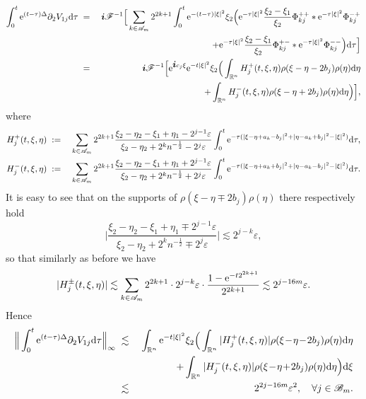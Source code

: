 \documentclass[11pt]{article}
\newcommand{\rmd}{\mbox{\rm d}}
\newcommand{\bfi}{{\mbox{\boldmath $i$}}}
\newcommand{\rme}{{\rm e}}
\begin{document}
\begin{eqnarray*}
  \int_0^t\rme^{(t-\tau)\Delta}\partial_2V_{1j}\rmd\tau&\;=\;&
  \bfi\mathscr{F}^{-1}\Big[\sum_{k\in\mathscr{A}_m}2^{2k+1}\int_0^t\rme^{-(t-\tau)|\xi|^2}\xi_2\Big(\rme^{-\tau|\xi|^2}
  \frac{\xi_2-\xi_1}{\xi_2}\Phi_{kj}^{++}\ast\rme^{-\tau|\xi|^2}\Phi_{kj}^{-+}
\\
  &&\quad +\rme^{-\tau|\xi|^2}\frac{\xi_2-\xi_1}{\xi_2}\Phi_{kj}^{+-}\ast
  \rme^{-\tau|\xi|^2}\Phi_{kj}^{--}\Big)\rmd\tau\Big]
\\
  &\;=\;&\bfi\mathscr{F}^{-1}\Big[\rme^{\bfi c_j\xi}\rme^{-t|\xi|^2}\xi_2\Big(\int_{\mathbb{R}^n}H^+_{j}(t,\xi,\eta)
  \rho(\xi-\eta-2b_j)\rho(\eta)\rmd\eta
\\
  &&\quad +\int_{\mathbb{R}^n}H^-_{j}(t,\xi,\eta)\rho(\xi-\eta+2b_j)\rho(\eta)\rmd\eta\Big)\Big],
\end{eqnarray*}
  where
\begin{eqnarray*}
  H^+_{j}(t,\xi,\eta)&\;:=\;&\sum_{k\in\mathscr{A}_m}2^{2k+1}
  \frac{\xi_2-\eta_2-\xi_1+\eta_1-2^{j-1}\varepsilon}{\xi_2-\eta_2+2^kn^{-\frac{1}{2}}-2^j\varepsilon}
  \int_0^t\rme^{-\tau(|\xi-\eta+a_k-b_j|^2+|\eta-a_k+b_j|^2-|\xi|^2)}\rmd\tau,
\\
  H^-_{j}(t,\xi,\eta)&\;:=\;&\sum_{k\in\mathscr{A}_m}2^{2k+1}
  \frac{\xi_2-\eta_2-\xi_1+\eta_1+2^{j-1}\varepsilon}{\xi_2-\eta_2+2^kn^{-\frac{1}{2}}+2^j\varepsilon}
  \int_0^t\rme^{-\tau(|\xi-\eta+a_k+b_j|^2+|\eta-a_k-b_j|^2-|\xi|^2)}\rmd\tau.
\end{eqnarray*}
  It is easy to see that on the supports of $\rho(\xi-\eta\mp2b_j)\rho(\eta)$ there respectively hold
$$
  \Big|\frac{\xi_2-\eta_2-\xi_1+\eta_1\mp2^{j-1}\varepsilon}{\xi_2-\eta_2+2^kn^{-\frac{1}{2}}\mp2^j\varepsilon}\Big|
  \lesssim 2^{j-k}\varepsilon,
$$
  so that similarly as before we have
$$
  |H^{\pm}_{j}(t,\xi,\eta)|\lesssim \sum_{k\in\mathscr{A}_m}2^{2k+1}\cdot 2^{j-k}\varepsilon\cdot
  \frac{1-\rme^{-t2^{2k+1}}}{2^{2k+1}}\lesssim 2^{j-16m}\varepsilon.
$$
  Hence
\begin{eqnarray*}
  \Big\|\int_0^t\rme^{(t-\tau)\Delta}\partial_2V_{1j}\rmd\tau\Big\|_{\infty}
  &\;\lesssim\;&\int_{\mathbb{R}^n}\rme^{-t|\xi|^2}\xi_2\Big(\int_{\mathbb{R}^n}|H^+_{j}(t,\xi,\eta)|
  \rho(\xi\!-\!\eta\!-\!2b_j)\rho(\eta)\rmd\eta
\\
  &&\quad +\int_{\mathbb{R}^n}|H^-_{j}(t,\xi,\eta)|\rho(\xi\!-\!\eta\!+\!2b_j)\rho(\eta)\rmd\eta\Big)\rmd\xi
\\
  &\;\lesssim\;& 2^{2j-16m}\varepsilon^2, \quad \forall j\in\mathscr{B}_m.
\end{eqnarray*}
\end{document}
